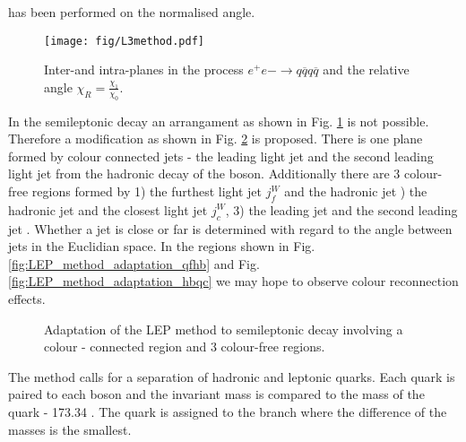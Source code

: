 has been performed on the normalised angle. 

\begin{figure}[hbtp]
  \centering
  \texttt{[image: fig/L3method.pdf]}
  \caption{Inter-\PW and intra-\PW planes in the process $e^{+}e{-}\rightarrow q\overline{q}q\overline{q}$ and the relative angle $\chi_{R}=\frac{\chi_{1}}{\chi_{0}}$.}
  \label{fig:LEP_method}
\end{figure}

In the \ttbar semileptonic decay an arrangament as shown in Fig. \ref{fig:LEP_method} is not possible. Therefore a modification as shown in Fig. \ref{fig:LEP_method_adaptation} is proposed. There is one plane formed by colour connected jets - the leading light jet \leadingjet and the second leading light jet \scndleadingjet from the hadronic decay of the \PW boson. Additionally there are 3 colour-free regions formed by 1) the furthest light jet $j^{W}_{f}$ and the hadronic \cPqb jet ) the hadronic \cPqb jet \hadronicb and the closest light jet $j^{W}_{c}$, 3) the leading \cPqb jet \leadingb and the second leading \cPqb jet \scndleadingb. Whether a jet is close or far is determined with regard to the angle between jets in the Euclidian space. In the regions shown in Fig. \ref{fig:LEP_method_adaptation_qfhb} and Fig. \ref{fig:LEP_method_adaptation_hbqc} we may hope to observe colour reconnection effects.

\begin{figure}[hbtp]
  \centering
  \def\twidth{0.24}
  \hfil
 \hfil
  \hfil
  \caption{Adaptation of the LEP method to \ttbar semileptonic decay involving a colour - connected region and 3 colour-free regions.}
  \label{fig:LEP_method_adaptation}
\end{figure}

The method calls for a separation of hadronic and leptonic \cPqb quarks. Each \cPqb quark is paired to each \PW boson and the invariant mass is compared to the mass of the \cPqt quark - 173.34 \GeV. The \cPqb quark is assigned to the branch where the difference of the masses is the smallest. 
